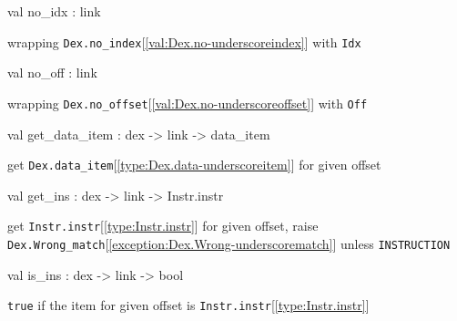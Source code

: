 \documentclass[11pt]{article}
\begin{document}
\label{val:Dex.no-underscoreidx}\begin{ocamldoccode}
val no_idx : link
\end{ocamldoccode}
\begin{ocamldocdescription}
wrapping {\tt{Dex.no\_index}}[\ref{val:Dex.no-underscoreindex}] with {\tt{Idx}}


\end{ocamldocdescription}




\label{val:Dex.no-underscoreoff}\begin{ocamldoccode}
val no_off : link
\end{ocamldoccode}
\begin{ocamldocdescription}
wrapping {\tt{Dex.no\_offset}}[\ref{val:Dex.no-underscoreoffset}] with {\tt{Off}}


\end{ocamldocdescription}




\label{val:Dex.get-underscoredata-underscoreitem}\begin{ocamldoccode}
val get_data_item : dex -> link -> data_item
\end{ocamldoccode}
\begin{ocamldocdescription}
get {\tt{Dex.data\_item}}[\ref{type:Dex.data-underscoreitem}] for given offset


\end{ocamldocdescription}




\label{val:Dex.get-underscoreins}\begin{ocamldoccode}
val get_ins : dex -> link -> Instr.instr
\end{ocamldoccode}
\begin{ocamldocdescription}
get {\tt{Instr.instr}}[\ref{type:Instr.instr}] for given offset,
 raise {\tt{Dex.Wrong\_match}}[\ref{exception:Dex.Wrong-underscorematch}] unless {\tt{INSTRUCTION}}


\end{ocamldocdescription}




\label{val:Dex.is-underscoreins}\begin{ocamldoccode}
val is_ins : dex -> link -> bool
\end{ocamldoccode}
\begin{ocamldocdescription}
{\tt{true}} if the item for given offset is {\tt{Instr.instr}}[\ref{type:Instr.instr}]


\end{ocamldocdescription}
\end{document}
